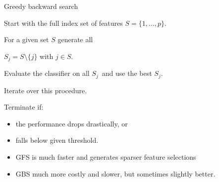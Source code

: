 \documentclass[11pt,compress,t,notes=noshow, xcolor=table]{beamer}
\begin{document}


\begin{vbframe}{Greedy backward search}

    \begin{blocki}{}
      \item Start with the full index set of features $S = \{1, \ldots, p\}$.
      \item For a given set $S$ generate all

      $S_j = S \setminus\{j\}$ with $j \in S$.
      \item Evaluate the classifier on all $S_j$\
        and use the best $S_j$.
      \item Iterate over this procedure.
      \item Terminate if:
        \begin{itemize}
          \item the performance drops drastically, or
          \item falls below given threshold.
        \end{itemize}
      \end{blocki}

      \begin{itemize}
          \item GFS is much faster and generates sparser feature selections
          \item GBS much more costly and slower, but sometimes slightly better.
      \end{itemize}

  \end{vbframe}
\end{document}
